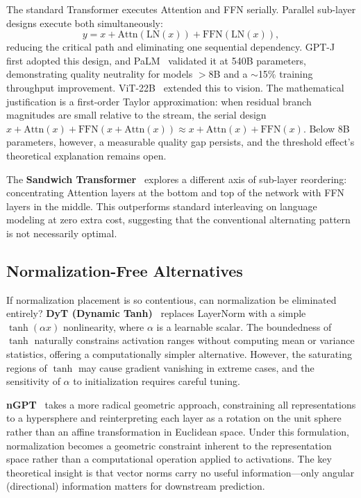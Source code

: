 The standard Transformer executes Attention and FFN serially. Parallel sub-layer designs execute both simultaneously:
\begin{equation}
  y = x + \mathrm{Attn}(\mathrm{LN}(x)) + \mathrm{FFN}(\mathrm{LN}(x)),
  \label{eq:parallel}
\end{equation}
reducing the critical path and eliminating one sequential dependency. GPT-J~\cite{wang2021gptj} first adopted this design, and PaLM~\cite{chowdhery2022palm} validated it at 540B parameters, demonstrating quality neutrality for models $>$8B and a $\sim$15\% training throughput improvement. ViT-22B~\cite{dehghani2023vit22b} extended this to vision. The mathematical justification is a first-order Taylor approximation: when residual branch magnitudes are small relative to the stream, the serial design $x + \mathrm{Attn}(x) + \mathrm{FFN}(x + \mathrm{Attn}(x)) \approx x + \mathrm{Attn}(x) + \mathrm{FFN}(x)$. Below 8B parameters, however, a measurable quality gap persists, and the threshold effect's theoretical explanation remains open.

The \textbf{Sandwich Transformer}~\cite{press2020sandwich} explores a different axis of sub-layer reordering: concentrating Attention layers at the bottom and top of the network with FFN layers in the middle. This outperforms standard interleaving on language modeling at zero extra cost, suggesting that the conventional alternating pattern is not necessarily optimal.

\subsection{Normalization-Free Alternatives}
\label{subsec:norm_free}

If normalization placement is so contentious, can normalization be eliminated entirely? \textbf{DyT (Dynamic Tanh)}~\cite{zhu2025dyt} replaces LayerNorm with a simple $\tanh(\alpha x)$ nonlinearity, where $\alpha$ is a learnable scalar. The boundedness of $\tanh$ naturally constrains activation ranges without computing mean or variance statistics, offering a computationally simpler alternative. However, the saturating regions of $\tanh$ may cause gradient vanishing in extreme cases, and the sensitivity of $\alpha$ to initialization requires careful tuning.

\textbf{nGPT}~\cite{loshchilov2024ngpt} takes a more radical geometric approach, constraining all representations to a hypersphere and reinterpreting each layer as a rotation on the unit sphere rather than an affine transformation in Euclidean space. Under this formulation, normalization becomes a geometric constraint inherent to the representation space rather than a computational operation applied to activations. The key theoretical insight is that vector norms carry no useful information---only angular (directional) information matters for downstream prediction.

